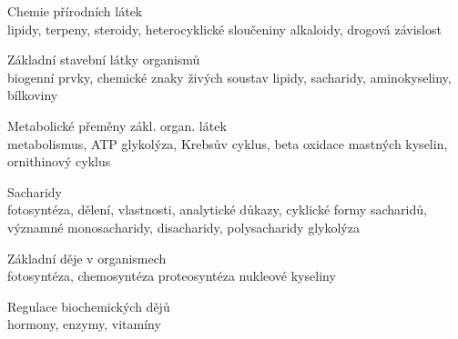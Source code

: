 \begin{boldEnum}
    \item Chemie přírodních látek \\    
    lipidy, terpeny, steroidy, heterocyklické sloučeniny alkaloidy, drogová závislost
    
    \item Základní stavební látky organismů \\    
    biogenní prvky, chemické znaky živých soustav lipidy, sacharidy, aminokyseliny, bílkoviny
    
    \item Metabolické přeměny zákl. organ. látek \\    
    metabolismus, ATP glykolýza, Krebsův cyklus, beta oxidace mastných kyselin, ornithinový cyklus
    
    \item Sacharidy \\    
    fotosyntéza, dělení, vlastnosti, analytické důkazy, cyklické formy sacharidů, významné
    monosacharidy, disacharidy, polysacharidy glykolýza
    
    \item Základní děje v organismech \\    
    fotosyntéza, chemosyntéza proteosyntéza nukleové kyseliny
    
    \item Regulace biochemických dějů \\    
    hormony, enzymy, vitamíny
\end{boldEnum}